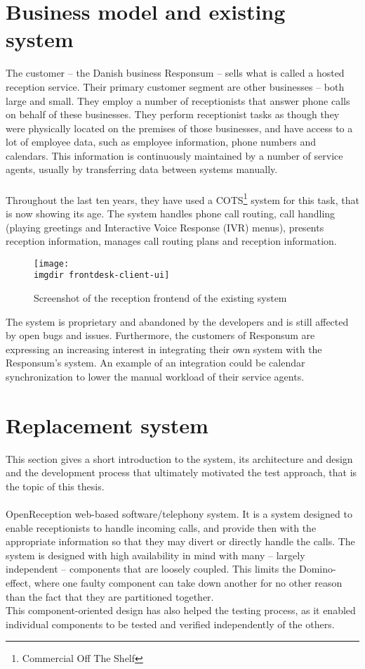 \section{Business model and existing system}
The customer -- the Danish business Responsum -- sells what is called a hosted reception service. Their primary customer segment are other businesses -- both large and small. They employ a number of receptionists that answer phone calls on behalf of these businesses. They perform receptionist tasks as though they were physically located on the premises of those businesses, and have access to a lot of employee data, such as employee information, phone numbers and calendars. This information is continuously maintained by a number of service agents, usually by transferring data between systems manually.\\\\
Throughout the last ten years, they have used a COTS\footnote{Commercial Off The Shelf} system for this task, that is now showing its age. The system handles phone call routing, call handling (playing greetings and Interactive Voice Response (IVR) menus), presents reception information, manages call routing plans and reception information.
\begin{figure}[ht]
\centering
\texttt{[image: \\imgdir frontdesk-client-ui]}
\caption{Screenshot of the reception frontend of the existing system}
\label{fig:frontdesk_screenshot}
\end{figure}
The system is proprietary and abandoned by the developers and is still affected by open bugs and issues. Furthermore, the customers of Responsum are expressing an increasing interest in integrating their own system with the Responsum's system. An example of an integration could be calendar synchronization to lower the manual workload of their service agents.

\section{Replacement system}
This section gives a short introduction to the system, its architecture and design and the development process that ultimately motivated the test approach, that is the topic of this thesis.\\\\
OpenReception web-based software/telephony system. It is a system designed to enable receptionists to handle incoming calls, and provide then with the appropriate information so that they may divert or directly handle the calls. The system is designed with high availability in mind with many -- largely independent -- components that are loosely coupled. This limits the Domino-effect, where one faulty component can take down another for no other reason than the fact that they are partitioned together.\\ This component-oriented design has also helped the testing process, as it enabled individual components to be tested and verified independently of the others.

